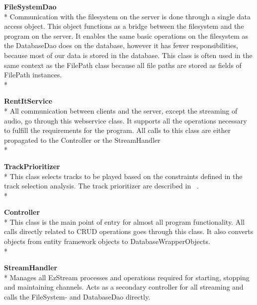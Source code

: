 \documentclass[a4paper,11pt,report]{article}
\begin{document}
\textbf{FileSystemDao} \\*
Communication with the filesystem on the server is done through a single data access object. This object functions as a bridge between the filesystem and the program on the server. It enables the same basic operations on the filesystem as the DatabaseDao does on the database, however it has fewer responsibilities, because most of our data is stored in the database. This class is often used in the same context as the FilePath class because all file paths are stored as fields of FilePath instances. \\*

\textbf{RentItService} \\*
All communication between clients and the server, except the streaming of audio, go through this webservice class. It supports all the operations necessary to fulfill the requirements for the program. All calls to this class are either propagated to the Controller or the StreamHandler \\*

\textbf{TrackPrioritizer} \\*
This class selects tracks to be played based on the constraints defined in the track selection analysis. The track prioritizer are described in ~. \\*

\textbf{Controller} \\*
This class is the main point of entry for almost all program functionality. All calls directly related to CRUD operations goes through this class. It also converts objects from entity framework objects to DatabaseWrapperObjects.\\*

\textbf{StreamHandler} \\*
Manages all EzStream processes and operations required for starting, stopping and maintaining channels. Acts as a secondary controller for all streaming and calls the FileSystem- and DatabaseDao directly.

\newpage
\end{document}
